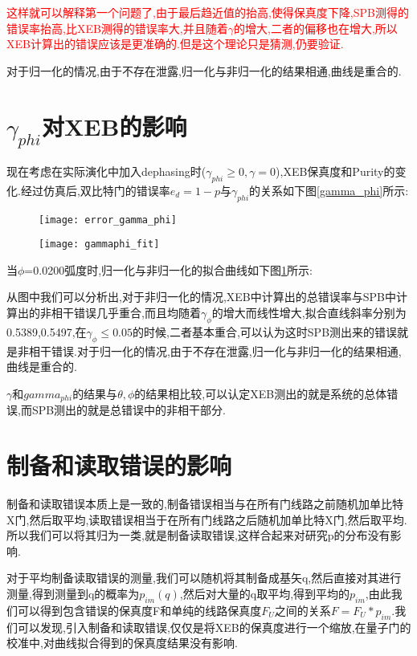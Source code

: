 \textcolor{red}{这样就可以解释第一个问题了,由于最后趋近值的抬高,使得保真度下降,SPB测得的错误率抬高,比XEB测得的错误率大,并且随着$\gamma$的增大,二者的偏移也在增大,所以XEB计算出的错误应该是更准确的.但是这个理论只是猜测,仍要验证.}

对于归一化的情况,由于不存在泄露,归一化与非归一化的结果相通,曲线是重合的.

\section{$\gamma_{phi}$对XEB的影响}

现在考虑在实际演化中加入dephasing时($\gamma_{phi} \geq 0 ,\gamma=0 $),XEB保真度和Purity的变化.经过仿真后,双比特门的错误率$e_{d} = 1-p$与$\gamma_{phi}$的关系如下图\ref{gamma_phi}所示:
\begin{figure}[ht]
	\centering
	\begin{minipage}{0.48\linewidth}
		\texttt{[image: error\_gamma\_phi]}
		\label{gamma_phi}
	\end{minipage}
	\begin{minipage}{0.48\linewidth}
		\texttt{[image: gammaphi\_fit]}
		\label{gamma_phi_fit}
	\end{minipage}
	
	\caption{} 
\end{figure}

当$\phi$=0.0200弧度时,归一化与非归一化的拟合曲线如下图\ref{gamma_phi_fit}所示:

从图中我们可以分析出,对于非归一化的情况,XEB中计算出的总错误率与SPB中计算出的非相干错误几乎重合,而且均随着$\gamma_{\phi}$的增大而线性增大,拟合直线斜率分别为0.5389,0.5497,在$\gamma_{\phi}\leq0.05$的时候,二者基本重合,可以认为这时SPB测出来的错误就是非相干错误.对于归一化的情况,由于不存在泄露,归一化与非归一化的结果相通,曲线是重合的.

$\gamma$和$gamma_{phi}$的结果与$\theta,\phi$的结果相比较,可以认定XEB测出的就是系统的总体错误,而SPB测出的就是总错误中的非相干部分.


\section{制备和读取错误的影响} 
制备和读取错误本质上是一致的,制备错误相当与在所有门线路之前随机加单比特X门,然后取平均,读取错误相当于在所有门线路之后随机加单比特X门,然后取平均.所以我们可以将其归为一类,就是制备读取错误,这样合起来对研究p的分布没有影响.

对于平均制备读取错误的测量,我们可以随机将其制备成基矢q,然后直接对其进行测量,得到测量到q的概率为$p_{im}(q)$,然后对大量的q取平均,得到平均的$p_{im}$,由此我们可以得到包含错误的保真度F和单纯的线路保真度$F_{U}$之间的关系$F = F_{U}*p_{im}$.我们可以发现,引入制备和读取错误,仅仅是将XEB的保真度进行一个缩放,在量子门的校准中,对曲线拟合得到的保真度结果没有影响.